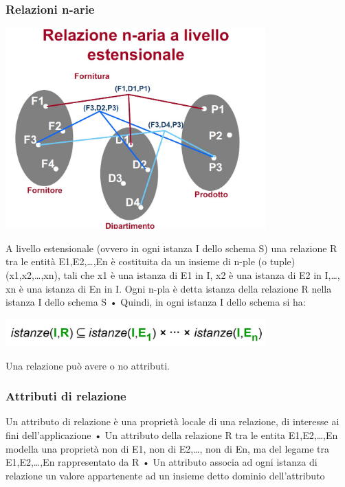 \subsubsection{Relazioni n-arie}
\begin{center}
    \includegraphics[width=0.75\textwidth]{chaptersLezioniSara/img/Relazioni5.jpg}
\end{center}
A livello estensionale (ovvero in ogni istanza I dello
schema S) una relazione R tra le entità E1,E2,…,En è
costituita da un insieme di n-ple (o tuple) (x1,x2,…,xn),
tali che x1 è una istanza di E1 in I, x2 è una istanza di
E2 in I,…, xn è una istanza di En in I. Ogni n-pla è detta
istanza della relazione R nella istanza I dello schema S
• Quindi, in ogni istanza I dello schema si ha:
\begin{center}
    \includegraphics[width=0.75\textwidth]{chaptersLezioniSara/img/Relazioni6.jpg}
\end{center}

Una relazione può avere o no attributi.

\subsubsection{Attributi di relazione}
Un attributo di relazione è una proprietà locale di una
relazione, di interesse ai fini dell’applicazione
• Un attributo della relazione R tra le entita E1,E2,…,En
modella una proprietà non di E1, non di E2,…, non di
En, ma del legame tra E1,E2,…,En rappresentato da
R
• Un attributo associa ad ogni istanza di relazione un
valore appartenente ad un insieme detto dominio
dell’attributo

